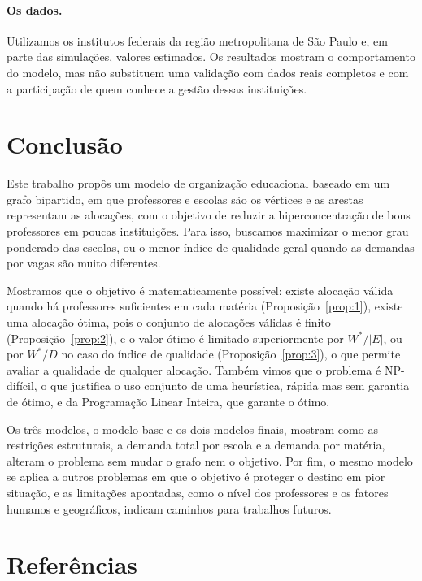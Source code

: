 \documentclass[12pt,a4paper]{article}
\begin{document}
\paragraph{Os dados.} Utilizamos os institutos federais da região metropolitana de São Paulo e, em parte das simulações, valores estimados. Os resultados mostram o comportamento do modelo, mas não substituem uma validação com dados reais completos e com a participação de quem conhece a gestão dessas instituições.


\section{Conclusão}

Este trabalho propôs um modelo de organização educacional baseado em um grafo bipartido, em que professores e escolas são os vértices e as arestas representam as alocações, com o objetivo de reduzir a hiperconcentração de bons professores em poucas instituições. Para isso, buscamos maximizar o menor grau ponderado das escolas, ou o menor índice de qualidade geral quando as demandas por vagas são muito diferentes.

Mostramos que o objetivo é matematicamente possível: existe alocação válida quando há professores suficientes em cada matéria (Proposição~\ref{prop:1}), existe uma alocação ótima, pois o conjunto de alocações válidas é finito (Proposição~\ref{prop:2}), e o valor ótimo é limitado superiormente por $W^*/|E|$, ou por $W^*/D$ no caso do índice de qualidade (Proposição~\ref{prop:3}), o que permite avaliar a qualidade de qualquer alocação. Também vimos que o problema é NP-difícil, o que justifica o uso conjunto de uma heurística, rápida mas sem garantia de ótimo, e da Programação Linear Inteira, que garante o ótimo.

Os três modelos, o modelo base e os dois modelos finais, mostram como as restrições estruturais, a demanda total por escola e a demanda por matéria, alteram o problema sem mudar o grafo nem o objetivo. Por fim, o mesmo modelo se aplica a outros problemas em que o objetivo é proteger o destino em pior situação, e as limitações apontadas, como o nível dos professores e os fatores humanos e geográficos, indicam caminhos para trabalhos futuros.

\vspace{\baselineskip}

\section*{Referências}
\end{document}
